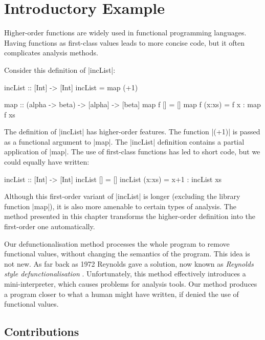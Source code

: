 \section{Introductory Example}
\label{secF:intro}

Higher-order functions are widely used in functional programming languages.  Having functions as first-class values leads to more concise code, but it often complicates analysis methods.

\begin{example}
\label{exF:incList}

Consider this definition of |incList|:

\begin{code}
incList :: [Int] -> [Int]
incList = map (+1)

map :: (alpha -> beta) -> [alpha] -> [beta]
map f []      = []
map f (x:xs)  = f x : map f xs
\end{code}

The definition of |incList| has higher-order features. The function |(+1)| is passed as a functional argument to |map|. The |incList| definition contains a partial application of |map|. The use of first-class functions has led to short code, but we could equally have written:

\begin{code}
incList :: [Int] -> [Int]
incList []      = []
incList (x:xs)  = x+1 : incList xs
\end{code}

Although this first-order variant of |incList| is longer (excluding the library function |map|), it is also more amenable to certain types of analysis. The method presented in this chapter transforms the higher-order definition into the first-order one automatically.
\end{example}

Our defunctionalisation method processes the whole program to remove functional values, without changing the semantics of the program. This idea is not new. As far back as 1972 Reynolds gave a solution, now known as \textit{Reynolds style defunctionalisation} \cite{reynolds:defunc}. Unfortunately, this method effectively introduces a mini-interpreter, which causes problems for analysis tools. Our method produces a program closer to what a human might have written, if denied the use of functional values.


\subsection{Contributions}

